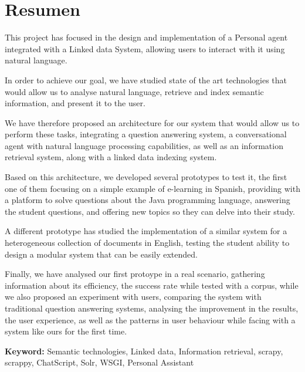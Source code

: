 \cleardoublepage
{}
\chapter*{Resumen}

This project has focused in the design and implementation of a Personal agent integrated with a Linked data System, allowing users to interact with it using natural language.

In order to achieve our goal, we have studied state of the art technologies that would allow us to analyse natural language, retrieve and index semantic information, and present it to the user.

We have therefore proposed an architecture for our system that would allow us to perform these tasks, integrating a question answering system, a conversational agent with natural language processing capabilities, as well as an information retrieval system, along with a linked data indexing system.

Based on this architecture, we developed several prototypes to test it, the first one of them focusing on a simple example of e-learning in Spanish, providing with a platform to solve questions about the Java programming language, answering the student questions, and offering new topics so they can delve into their study.

A different prototype has studied the implementation of a similar system for a heterogeneous collection of documents in English, testing the student ability to design a modular system that can be easily extended.

Finally, we have analysed our first protoype in a real scenario, gathering information about its efficiency, the success rate while tested with a corpus, while we also proposed an experiment with users, comparing the system with traditional question answering systems, analysing the improvement in the results, the user experience, as well as the patterns in user behaviour while facing with a system like ours for the first time.

\vfill
\textbf{Keyword:} Semantic technologies, Linked data, Information retrieval, scrapy, scrappy, ChatScript, Solr, WSGI, Personal Assistant